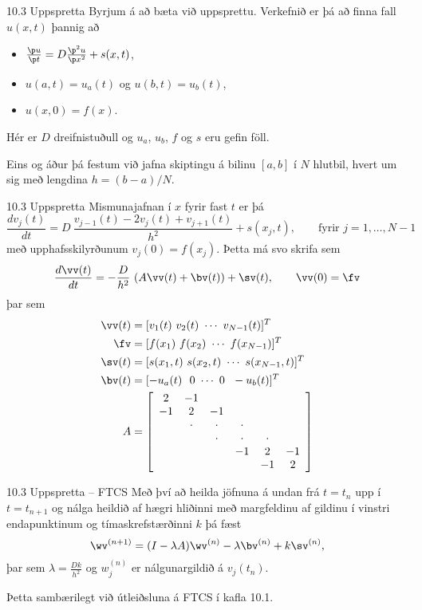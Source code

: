   \begin{frame}{10.3 Uppspretta}
   Byrjum á að bæta við uppsprettu. \pause
   Verkefnið er þá að finna fall $u(x,t)$ þannig að 
   \begin{itemize}
 \item $\frac{\p u}{\p t} =  D \frac{\p^2 u}{\p x^2} + s(x,t)$,
 \item $u(a,t) = u_a(t)$ og $u(b,t) = u_b(t)$, 
 \item $u(x,0) = f(x)$.
\end{itemize}
Hér er $D$ dreifnistuðull og $u_a$, $u_b$, $f$ og $s$ eru gefin
föll.

Eins og áður þá festum við jafna skiptingu á bilinu $[a,b]$ í $N$ hlutbil,
hvert um sig með lengdina $h = (b-a)/N$.
\end{frame}

\begin{frame}{10.3 Uppspretta}
Mismunajafnan í $x$ fyrir fast $t$ er þá 
 $$ 
 \frac{d v_j(t)}{d t} =  D\  \frac{v_{j-1}(t) -2 v_j(t) + v_{j+1}(t)}{h^2} + s(x_j,t), \qquad
 \text{fyrir } j=1,\ldots,N-1
 $$ \pause
 með upphafsskilyrðunum $v_j(0) = f(x_j)$. \pause
 Þetta má svo skrifa sem
 $$ 
 \frac{d \vv(t)}{d t} =  -\frac{D}{h^2}\  (A\vv(t) + \bv(t)) + \sv(t), \qquad \vv(0)=\fv
 $$
 þar sem 
 {\small \begin{align*}
  \vv(t) &= [v_1(t) \ v_2(t) \ \cdots \ v_{N-1}(t) ]^T\\
  \fv &= [ f(x_1) \ f(x_2) \ \cdots \ f(x_{N-1}) ]^T\\
  \sv(t) &= [ s(x_1,t) \ s(x_2,t) \ \cdots \ s(x_{N-1},t) ]^T\\
  \bv(t) &= [ -u_a(t) \ \ 0 \ \cdots \ 0 \ \ -u_b(t) ]^T \\
  A &=  \left[\begin{array}{cccccc}
2 & -1 &   &   &   &  \\
-1 & 2 & -1 &   &   &  \\
  & \cdot & \cdot & \cdot &   &  \\
  &   & \cdot & \cdot & \cdot &  \\
  &   &  & -1 & 2 & -1\\
  &   &   &   & -1 & 2
      \end{array}\right] 
 \end{align*}}
  \end{frame}

  \begin{frame}{10.3 Uppspretta -- FTCS}
   Með því að heilda jöfnuna á undan frá $t=t_n$ upp í $t=t_{n+1}$
   og nálga heildið af hægri hliðinni með margfeldinu af gildinu í vinstri
   endapunktinum og tímaskrefstærðinni $k$ þá fæst
   $$
    \wv^{(n+1)} = (I-\lambda A)\wv^{(n)} - \lambda \bv^{(n)} + k\sv^{(n)},
    $$
    þar sem $\lambda = \frac{Dk}{h^2}$ og 
    $w_j^{(n)}$ er nálgunargildið á $v_j(t_n)$. \pause
    
    \smallskip
    Þetta sambærilegt við útleiðsluna á FTCS í kafla 10.1.
  \end{frame}

